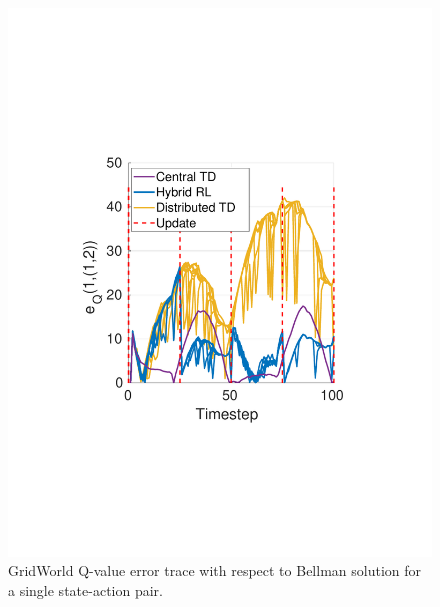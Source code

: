 \documentclass[journal]{IEEEtran}
\begin{document}
\begin{figure}
    \centering
    \includegraphics[scale = 0.5, trim={3cm 6.5cm 3cm 7.5cm}, clip]{q_err_track.pdf}
    \caption{GridWorld Q-value error trace with respect to Bellman solution for a single state-action pair.}
    \label{fig:qtrace}
\end{figure}
\end{document}

